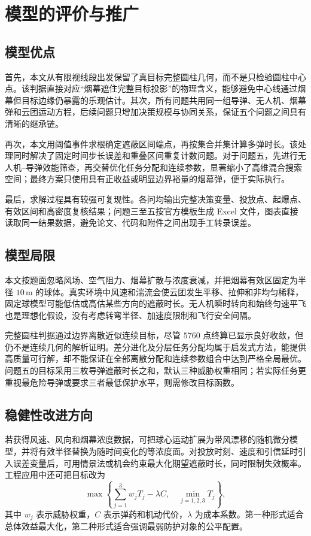 \section{模型的评价与推广}

\subsection{模型优点}

首先，本文从有限视线段出发保留了真目标完整圆柱几何，而不是只检验圆柱中心点。该判据直接对应“烟幕遮住完整目标投影”的物理含义，能够避免中心线通过烟幕但目标边缘仍暴露的乐观估计。其次，所有问题共用同一组导弹、无人机、烟幕弹和云团运动方程，后续问题只增加决策规模与协同关系，保证五个问题之间具有清晰的继承链。

再次，本文用阈值事件求根确定遮蔽区间端点，再按集合并集计算多弹时长。该处理同时解决了固定时间步长误差和重叠区间重复计数问题。对于问题五，先进行无人机--导弹效能筛查，再交替优化任务分配和连续参数，显著缩小了高维混合搜索空间；最终方案只使用具有正收益或明显边界裕量的烟幕弹，便于实际执行。

最后，求解过程具有较强可复现性。各问均输出完整决策变量、投放点、起爆点、有效区间和高密度复核结果；问题三至五按官方模板生成 Excel 文件，图表直接读取同一结果数据，避免论文、代码和附件之间出现手工转录误差。

\subsection{模型局限}

本文按题面忽略风场、空气阻力、烟幕扩散与浓度衰减，并把烟幕有效区固定为半径 $10\,\mathrm{m}$ 的球体。真实环境中风速和湍流会使云团发生平移、拉伸和非均匀稀释，固定球模型可能低估或高估某些方向的遮蔽时长。无人机瞬时转向和始终匀速平飞也是理想化假设，没有考虑转弯半径、加速度限制和飞行安全间隔。

完整圆柱判据通过边界离散近似连续目标，尽管 $5760$ 点终算已显示良好收敛，但仍不是连续几何的解析证明。差分进化及分层任务分配均属于启发式方法，能提供高质量可行解，却不能保证在全部离散分配和连续参数组合中达到严格全局最优。问题五的目标采用三枚导弹遮蔽时长之和，默认三种威胁权重相同；若实际任务更重视最危险导弹或要求三者最低保护水平，则需修改目标函数。

\subsection{稳健性改进方向}

若获得风速、风向和烟幕浓度数据，可把球心运动扩展为带风漂移的随机微分模型，并将有效半径替换为随时间变化的等浓度面。对投放时刻、速度和引信延时引入误差变量后，可用情景法或机会约束最大化期望遮蔽时长，同时限制失效概率。工程应用中还可把目标改为
\begin{equation}
 \max\left\{\sum_{j=1}^{3}w_jT_j-\lambda C,
 \quad \min_{j=1,2,3}T_j\right\},
\end{equation}
其中 $w_j$ 表示威胁权重，$C$ 表示弹药和机动代价，$\lambda$ 为成本系数。第一种形式适合总体效益最大化，第二种形式适合强调最弱防护对象的公平配置。

